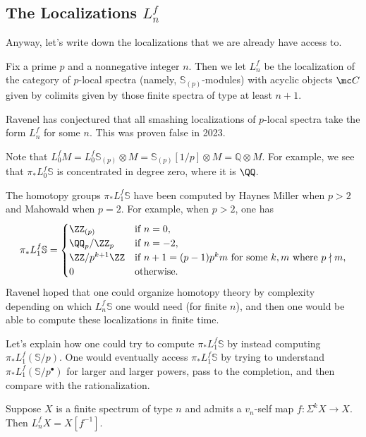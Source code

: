 \documentclass[../notes.tex]{subfiles}
\begin{document}
\subsection{The Localizations \texorpdfstring{$L_n^f$}{ Lnf}}
Anyway, let's write down the localizations that we are already have access to.
\begin{definition}
	Fix a prime $p$ and a nonnegative integer $n$. Then we let $L_n^f$ be the localization of the category of $p$-local spectra (namely, $\mathbb S_{(p)}$-modules) with acyclic objects $\mc C$ given by colimits given by those finite spectra of type at least $n+1$.
\end{definition}
\begin{remark}[Telescope]
	Ravenel has conjectured that all smashing localizations of $p$-local spectra take the form $L_n^f$ for some $n$. This was proven false in 2023.
\end{remark}
\begin{example}
	Note that $L_0^fM=L_0^f\mathbb S_{(p)}\otimes M=\mathbb S_{(p)}[1/p]\otimes M=\mathbb Q\otimes M$. For example, we see that $\pi_*L_0^f\mathbb S$ is concentrated in degree zero, where it is $\QQ$.
\end{example}
\begin{example}
	The homotopy groups $\pi_*L_1^f\mathbb S$ have been computed by Haynes Miller when $p>2$ and Mahowald when $p=2$. For example, when $p>2$, one has
	\[\pi_*L_1^f\mathbb S=\begin{cases}
		\ZZ_{(p)} & \text{if }n=0, \\
		\QQ_p/\ZZ_p & \text{if }n=-2, \\
		\ZZ/p^{k+1}\ZZ & \text{if }n+1=(p-1)p^km\text{ for some }k,m\text{ where }p\nmid m, \\
		0 & \text{otherwise}.
	\end{cases}\]
	Ravenel hoped that one could organize homotopy theory by complexity depending on which $L_n^f\mathbb S$ one would need (for finite $n$), and then one would be able to compute these localizations in finite time.
\end{example}
Let's explain how one could try to compute $\pi_*L_1^f\mathbb S$ by instead computing $\pi_*L_1^f(\mathbb S/p)$. One would eventually access $\pi_*L_1^f\mathbb S$ by trying to understand $\pi_*L_1^f(\mathbb S/p^\bullet)$ for larger and larger powers, pass to the completion, and then compare with the rationalization.
\begin{proposition}
	Suppose $X$ is a finite spectrum of type $n$ and admits a $v_n$-self map $f\colon\Sigma^kX\to X$. Then $L_n^fX=X\left[f^{-1}\right]$.
\end{proposition}
\end{document}
